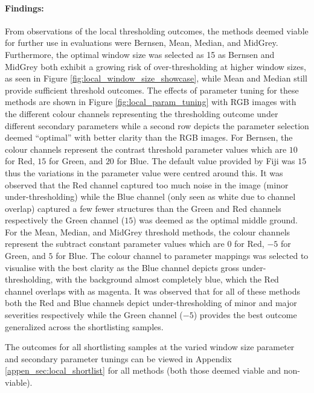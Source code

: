 \paragraph{Findings:} From observations of the local thresholding outcomes, the methods deemed viable for further use in evaluations were Bernsen, Mean, Median, and MidGrey. Furthermore, the optimal window size was selected as 15 as Bernsen and MidGrey both exhibit a growing risk of over-thresholding at higher window sizes, as seen in Figure \ref{fig:local_window_size_showcase}, while Mean and Median still provide sufficient threshold outcomes. The effects of parameter tuning for these methods are shown in Figure \ref{fig:local_param_tuning} with RGB images with the different colour channels representing the thresholding outcome under different secondary parameters while a second row depicts the parameter selection deemed ``optimal'' with better clarity than the RGB images. For Bernsen, the colour channels represent the contrast threshold parameter values which are $10$ for Red, $15$ for Green, and $20$ for Blue. The default value provided by Fiji was $15$ thus the variations in the parameter value were centred around this. It was observed that the Red channel captured too much noise in the image (minor under-thresholding) while the Blue channel (only seen as white due to channel overlap) captured a few fewer structures than the Green and Red channels respectively the Green channel ($15$) was deemed as the optimal middle ground. For the Mean, Median, and MidGrey threshold methods, the colour channels represent the subtract constant parameter values which are $0$ for Red, $-5$ for Green, and $5$ for Blue. The colour channel to parameter mappings was selected to visualise with the best clarity as the Blue channel depicts gross under-thresholding, with the background almost completely blue, which the Red channel overlaps with as magenta. It was observed that for all of these methods both the Red and Blue channels depict under-thresholding of minor and major severities respectively while the Green channel ($-5$) provides the best outcome generalized across the shortlisting samples. \par The outcomes for all shortlisting samples at the varied window size parameter and secondary parameter tunings can be viewed in Appendix \ref{appen_sec:local_shortlist} for all methods (both those deemed viable and non-viable).


